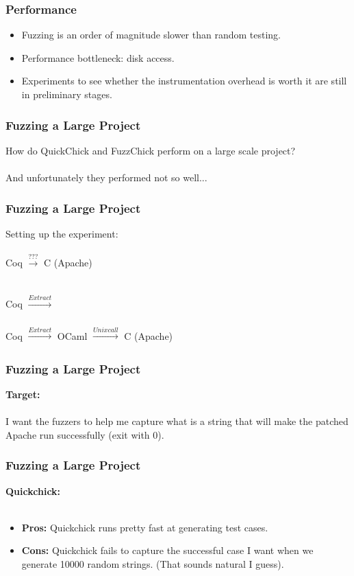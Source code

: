 \documentclass{beamer}
\begin{document}
\begin{frame}
  \frametitle{Performance}
  \begin{itemize}
  \item Fuzzing is an order of magnitude slower than random testing.
  \item Performance bottleneck: disk access.
  \item Experiments to see whether the instrumentation overhead is worth it are
    still in preliminary stages.
  \end{itemize}
\end{frame}

\begin{frame}
  \frametitle{Fuzzing a Large Project}
  How do QuickChick and FuzzChick perform on a large scale project? \\~\\
 
  \pause
  And unfortunately they performed not so well...
    
\end{frame}

\begin{frame}
\frametitle{Fuzzing a Large Project}
Setting up the experiment: \\~\\

Coq $\xrightarrow[]{???}$ C (Apache) \\~\\

\pause{}

Coq $\xrightarrow[]{Extract}$  \\~\\

\pause{}
Coq $\xrightarrow[]{Extract}$ OCaml $\xrightarrow[]{Unix call}$ C (Apache)

\end{frame}

\begin{frame}
\frametitle{Fuzzing a Large Project}

\textbf {Target:} \\~\\
I want the fuzzers to help me capture what is a string that will make the patched Apache run successfully (exit with 0).
    
\end{frame}

\begin{frame}
\frametitle{Fuzzing a Large Project}

\textbf{Quickchick:} \\~\\

\begin{itemize}
    \item \textbf{Pros:} Quickchick runs pretty fast at generating test cases.
    
    \item \textbf{Cons:} Quickchick fails to capture the successful case I want when we generate 10000 random strings. (That sounds natural I guess).
\end{itemize}

\end{frame}
\end{document}
